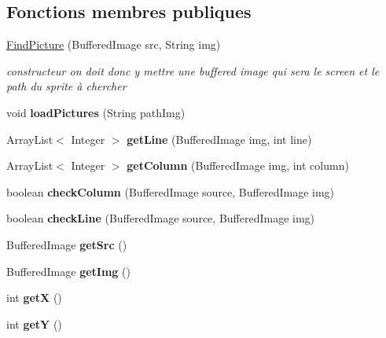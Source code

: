 \subsection*{Fonctions membres publiques}
\begin{DoxyCompactItemize}
\item 
\hyperlink{classFindPicture_ad697aff71f6479cf2345e6a80ed4ebb6}{Find\+Picture} (Buffered\+Image src, String img)
\begin{DoxyCompactList}\small\item\em constructeur on doit donc y mettre une buffered image qui sera le screen et le path du sprite à chercher \end{DoxyCompactList}\item 
\hypertarget{classFindPicture_a2204f21029e624f020162403c1575b47}{void {\bfseries load\+Pictures} (String path\+Img)}\label{classFindPicture_a2204f21029e624f020162403c1575b47}

\item 
\hypertarget{classFindPicture_aac2aafb41b291a82a8610a04c1025ce1}{Array\+List$<$ Integer $>$ {\bfseries get\+Line} (Buffered\+Image img, int line)}\label{classFindPicture_aac2aafb41b291a82a8610a04c1025ce1}

\item 
\hypertarget{classFindPicture_ac2dd2bde3776151960bff136fea75dc6}{Array\+List$<$ Integer $>$ {\bfseries get\+Column} (Buffered\+Image img, int column)}\label{classFindPicture_ac2dd2bde3776151960bff136fea75dc6}

\item 
\hypertarget{classFindPicture_aabc9cdcfadd7342e9f961d62f87997d0}{boolean {\bfseries check\+Column} (Buffered\+Image source, Buffered\+Image img)}\label{classFindPicture_aabc9cdcfadd7342e9f961d62f87997d0}

\item 
\hypertarget{classFindPicture_aa7bb6bab2d2cdebbacf9b6dadebad78b}{boolean {\bfseries check\+Line} (Buffered\+Image source, Buffered\+Image img)}\label{classFindPicture_aa7bb6bab2d2cdebbacf9b6dadebad78b}

\item 
\hypertarget{classFindPicture_ae170b7d5206ef838e49ab18dd2f930ac}{Buffered\+Image {\bfseries get\+Src} ()}\label{classFindPicture_ae170b7d5206ef838e49ab18dd2f930ac}

\item 
\hypertarget{classFindPicture_a74227c37722d2af2338a10da9bf97847}{Buffered\+Image {\bfseries get\+Img} ()}\label{classFindPicture_a74227c37722d2af2338a10da9bf97847}

\item 
\hypertarget{classFindPicture_a97f9a07435e5d763ebc17410a96a108f}{int {\bfseries get\+X} ()}\label{classFindPicture_a97f9a07435e5d763ebc17410a96a108f}

\item 
\hypertarget{classFindPicture_aeb910c0c9658a3dd341df9c502a09954}{int {\bfseries get\+Y} ()}\label{classFindPicture_aeb910c0c9658a3dd341df9c502a09954}

\end{DoxyCompactItemize}

